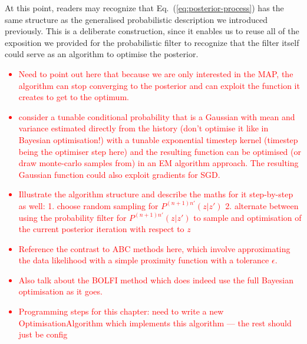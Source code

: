 At this point, readers may recognize that Eq.~(\ref{eq:posterior-process}) has the same structure as the generalised probabilistic description we introduced previously. This is a deliberate construction, since it enables us to reuse all of the exposition we provided for the probabilistic filter to recognize that the filter itself could serve as an algorithm to optimise the posterior.  

\textcolor{red}{\begin{itemize}
\item{Need to point out here that because we are only interested in the MAP, the algorithm can stop converging to the posterior and can exploit the function it creates to get to the optimum.}
\item{consider a tunable conditional probability that is a Gaussian with mean and variance estimated directly from the history (don't optimise it like in Bayesian optimisation!) with a tunable exponential timestep kernel (timestep being the optimiser step here) and the resulting function can be optimised (or draw monte-carlo samples from) in an EM algorithm approach. The resulting Gaussian function could also exploit gradients for SGD.}
\item{Illustrate the algorithm structure and describe the maths for it step-by-step as well: 1. choose random sampling for $P^{(n+1)n'}(z\vert z')$ 2. alternate between using the probability filter for $P^{(n+1)n'}(z\vert z')$ to sample and optimisation of the current posterior iteration with respect to $z$}
\item{Reference the contrast to ABC methods here, which involve approximating the data likelihood with a simple proximity function with a tolerance $\epsilon$.}
\item{Also talk about the BOLFI method which does indeed use the full Bayesian optimisation as it goes.}
\item{Programming steps for this chapter: need to write a new OptimisationAlgorithm which implements this algorithm --- the rest should just be config}
\end{itemize}}

